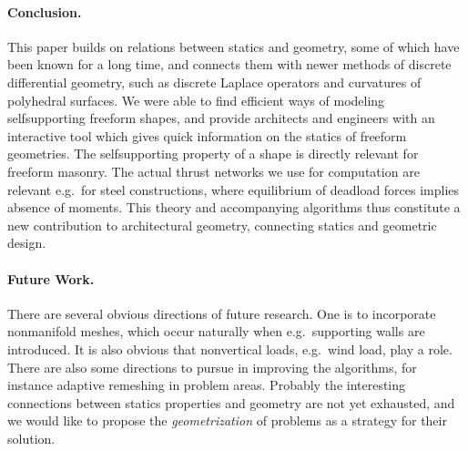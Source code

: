 \documentclass[review]{acmsiggraph}
\begin{document}
\paragraph{Conclusion.}

This paper builds on relations between statics and geometry, some of
which have been known for a long time, and connects them with newer
methods of discrete differential geometry, such as discrete Laplace
operators and curvatures of polyhedral surfaces. We were able to find
efficient ways of modeling self\dash supporting freeform shapes,
and provide architects and engineers with an interactive tool which
gives quick information on the statics of freeform geometries.
The self\dash supporting property of a shape is directly relevant for
freeform masonry. The actual thrust networks we use for computation
are relevant e.g.\ for steel constructions, where equilibrium of deadload
forces implies absence of moments. This theory and accompanying
algorithms thus constitute a new contribution to architectural
geometry, connecting statics and
geometric design.

\paragraph{Future Work.}

There are several obvious directions of future research. One is to 
incorporate non\dash manifold meshes, which occur naturally when e.g.\
supporting walls are introduced. It is also obvious that non\dash vertical
loads, e.g.\ wind load, play a role. There are also some directions to
pursue in improving the algorithms, for instance adaptive remeshing
in problem areas. Probably the interesting connections between statics
properties and geometry are not yet exhausted, and we would like to
propose the {\em geometrization} of problems as a strategy for their
solution.

\end{document}
